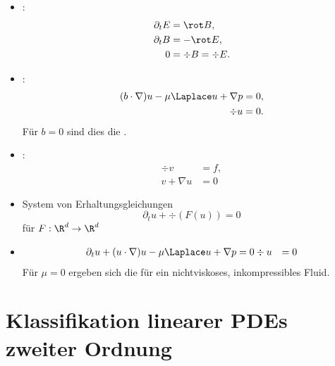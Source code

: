 \begin{ex} \label{1.12}
	\begin{itemize}
		\item
			:
			\begin{align*}
				\partial_t E &= \rot B, \\
				\partial_t B &= - \rot E, \\
				0 &= \div B = \div E.
			\end{align*}
		\item
			:
			\begin{align*}
				(b \cdot \nabla) u - \mu \Laplace u + \nabla p &= 0, \\
				\div u &= 0.
			\end{align*}
			Für $b = 0$ sind dies die .
		\item
			:
			\begin{align*}
				\div v &= f, \\
				v + \nabla u &= 0
			\end{align*}
	\end{itemize}
\end{ex}

\begin{ex} \label{1.13}
	\begin{itemize}
		\item
			System von Erhaltungsgleichungen
			\[
				\partial_t u + \div(F(u)) = 0
			\]
			für $F: \R^d \to \R^d$
		\item
			\begin{align*}
				\partial_t u + (u\cdot \nabla) u - \mu \Laplace u + \nabla p &= 0
				\div u &= 0
			\end{align*}
			Für $\mu = 0$ ergeben sich die  für ein nichtviskoses, inkompressibles Fluid.
	\end{itemize}
\end{ex}


\section{Klassifikation linearer PDEs zweiter Ordnung}


